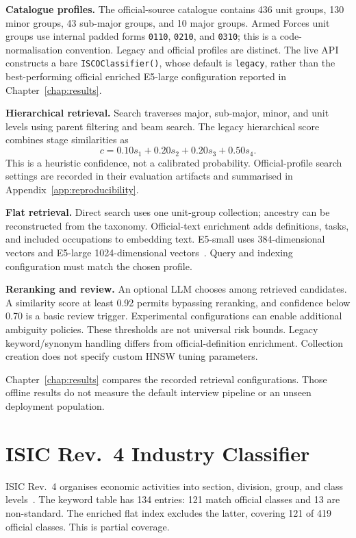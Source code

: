 \textbf{Catalogue profiles.} The official-source catalogue contains
436 unit groups, 130 minor groups, 43 sub-major groups, and 10 major
groups. Armed Forces unit groups use internal padded forms
\texttt{0110}, \texttt{0210}, and \texttt{0310}; this is a code-normalisation
convention. Legacy and official profiles are distinct. The live API
constructs a bare \texttt{ISCOClassifier()}, whose default is
\texttt{legacy}, rather than the best-performing official enriched
E5-large configuration reported in Chapter~\ref{chap:results}.

\textbf{Hierarchical retrieval.} Search traverses major, sub-major, minor,
and unit levels using parent filtering and beam search. The legacy
hierarchical score combines stage similarities as
\begin{equation}
 c = 0.10s_1+0.20s_2+0.20s_3+0.50s_4.
\end{equation}
This is a heuristic confidence, not a calibrated probability.
Official-profile search settings are recorded in their evaluation
artifacts and summarised in Appendix~\ref{app:reproducibility}.

\textbf{Flat retrieval.} Direct search uses one unit-group collection;
ancestry can be reconstructed from the taxonomy. Official-text enrichment
adds definitions, tasks, and included occupations to embedding text.
E5-small uses 384-dimensional vectors and E5-large 1024-dimensional
vectors~\cite{wang2024multilinguale5}. Query and indexing configuration
must match the chosen profile.

\textbf{Reranking and review.} An optional LLM chooses among retrieved
candidates. A similarity score at least 0.92 permits bypassing reranking,
and confidence below 0.70 is a basic review trigger. Experimental
configurations can enable additional ambiguity policies. These thresholds
are not universal risk bounds. Legacy keyword/synonym handling differs
from official-definition enrichment. Collection creation does not specify
custom HNSW tuning parameters.

Chapter~\ref{chap:results} compares the recorded retrieval configurations.
Those offline results do not measure the default interview pipeline or
an unseen deployment population.

\section{ISIC Rev.~4 Industry Classifier}
\label{sec:arch-isic}

ISIC Rev.~4 organises economic activities into section, division, group,
and class levels~\cite{unsd2008isic}. The keyword table has 134 entries:
121 match official classes and 13 are non-standard. The enriched flat
index excludes the latter, covering 121 of 419 official classes. This is
partial coverage.

